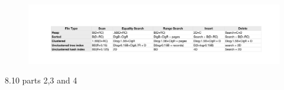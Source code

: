 \begin{problem}{8.6}
  \begin{solution}
    \begin{figure}[H]
      \centering
      \includegraphics[scale=0.65]{problem_8_6.pdf}
    \end{figure}
  \end{solution}
\end{problem}

\begin{problem}{8.10 parts 2,3 and 4}
\end{problem}

\begin{problem}{12.2}
\end{problem}

\begin{problem}{12.4}
\end{problem}

\begin{problem}{12.6}
\end{problem}



